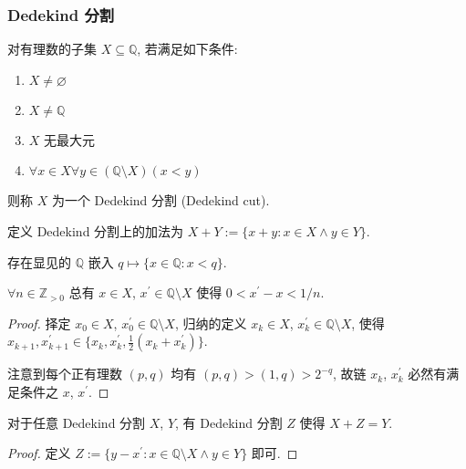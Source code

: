 \subsubsection{Dedekind 分割}

\begin{definition}[Dedekind 分割]
    对有理数的子集 \(X \subseteq \mathbb{Q}\), 若满足如下条件:
    \begin{enumerate}
        \item \(X \neq \varnothing\)
        \item \(X \neq \mathbb{Q}\)
        \item \(X\) 无最大元
        \item \(\forall x \in X \forall y \in (\mathbb{Q} \setminus X) (x < y)\)
    \end{enumerate}
    则称 \(X\) 为一个 Dedekind 分割 (Dedekind cut).
\end{definition}

\begin{definition}
    定义 Dedekind 分割上的加法为 \(X + Y := \{x + y : x \in X \land y \in Y\}\).
\end{definition}

\begin{lemma}
    存在显见的 \(\mathbb{Q}\) 嵌入 \(q \mapsto \{x \in \mathbb{Q} : x < q\}\).
\end{lemma}

\begin{lemma}
    \label {lemma:real numbers Dedekind cut closeness}
    \(\forall n \in \mathbb{Z}_{>0}\) 总有 \(x \in X\), \(x^\prime \in \mathbb{Q} \setminus X\) 使得 \(0 < x^\prime - x < 1 / n\).

    \begin{proof}
        择定 \(x_0 \in X\), \(x_0^\prime \in \mathbb{Q} \setminus X\), 归纳的定义 \(x_k \in X\), \(x_k^\prime \in \mathbb{Q} \setminus X\),
        使得 \(x_{k+1}, x_{k+1}^\prime \in \{x_k,x_k^\prime, \frac{1}{2} (x_k + x_k^\prime)\}\).

        注意到每个正有理数 \((p,q)\) 均有 \((p,q) > (1,q) > 2^{-q}\), 故链 \(x_k\), \(x_k^\prime\) 必然有满足条件之 \(x\), \(x^\prime\).
    \end{proof}
\end{lemma}

\begin{lemma}
    对于任意 Dedekind 分割 \(X\), \(Y\), 有 Dedekind 分割 \(Z\) 使得 \(X + Z = Y\).

    \begin{proof}
        定义 \(Z := \{y - x^\prime : x \in \mathbb{Q} \setminus X \land y \in Y\}\) 即可.
    \end{proof}
\end{lemma}

